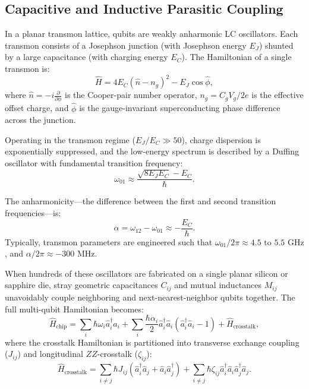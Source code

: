 \subsection{Capacitive and Inductive Parasitic Coupling}

In a planar transmon lattice, qubits are weakly anharmonic LC oscillators. Each transmon consists of a Josephson junction (with Josephson energy $E_J$) shunted by a large capacitance (with charging energy $E_C$). The Hamiltonian of a single transmon is:
\begin{equation}
    \hat{H} = 4 E_C (\hat{n} - n_g)^2 - E_J \cos \hat{\phi},
    \label{eq:transmon_hamiltonian}
\end{equation}
where $\hat{n} = -i \frac{\partial}{\partial \phi}$ is the Cooper-pair number operator, $n_g = C_g V_g / 2e$ is the effective offset charge, and $\hat{\phi}$ is the gauge-invariant superconducting phase difference across the junction.

Operating in the transmon regime ($E_J / E_C \gg 50$), charge dispersion is exponentially suppressed, and the low-energy spectrum is described by a Duffing oscillator with fundamental transition frequency:
\begin{equation}
    \omega_{01} \approx \frac{\sqrt{8 E_J E_C} - E_C}{\hbar}.
    \label{eq:transmon_frequency}
\end{equation}

The anharmonicity---the difference between the first and second transition frequencies---is:
\begin{equation}
    \alpha = \omega_{12} - \omega_{01} \approx -\frac{E_C}{\hbar}.
\end{equation}
Typically, transmon parameters are engineered such that $\omega_{01} / 2\pi \approx 4.5\text{ to }5.5\text{ GHz}$, and $\alpha / 2\pi \approx -300\text{ MHz}$.

When hundreds of these oscillators are fabricated on a single planar silicon or sapphire die, stray geometric capacitances $C_{ij}$ and mutual inductances $M_{ij}$ unavoidably couple neighboring and next-nearest-neighbor qubits together. The full multi-qubit Hamiltonian becomes:
\begin{equation}
    \hat{H}_{\text{chip}} = \sum_{i} \hbar \omega_i \hat{a}_i^\dagger \hat{a}_i + \sum_{i} \frac{\hbar \alpha_i}{2} \hat{a}_i^\dagger \hat{a}_i (\hat{a}_i^\dagger \hat{a}_i - 1) + \hat{H}_{\text{crosstalk}},
\end{equation}
where the crosstalk Hamiltonian is partitioned into transverse exchange coupling ($J_{ij}$) and longitudinal $ZZ$-crosstalk ($\zeta_{ij}$):
\begin{equation}
    \hat{H}_{\text{crosstalk}} = \sum_{i \neq j} \hbar J_{ij} (\hat{a}_i^\dagger \hat{a}_j + \hat{a}_i \hat{a}_j^\dagger) + \sum_{i \neq j} \hbar \zeta_{ij} \hat{a}_i^\dagger \hat{a}_i \hat{a}_j^\dagger \hat{a}_j.
    \label{eq:crosstalk_hamiltonian}
\end{equation}

